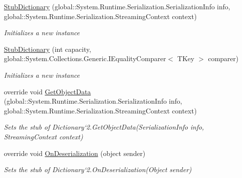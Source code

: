 \begin{DoxyCompactItemize}
\hyperlink{class_system_1_1_collections_1_1_generic_1_1_fakes_1_1_stub_dictionary_3_01_t_key_00_01_t_value_01_4_ae3ff78cf04461f0a35bd75524e225815}{Stub\-Dictionary} (global\-::\-System.\-Runtime.\-Serialization.\-Serialization\-Info info, global\-::\-System.\-Runtime.\-Serialization.\-Streaming\-Context context)
\begin{DoxyCompactList}\small\item\em Initializes a new instance\end{DoxyCompactList}\item 
\hyperlink{class_system_1_1_collections_1_1_generic_1_1_fakes_1_1_stub_dictionary_3_01_t_key_00_01_t_value_01_4_afbaf1846f7eff67ea06a9dc59f83c4a6}{Stub\-Dictionary} (int capacity, global\-::\-System.\-Collections.\-Generic.\-I\-Equality\-Comparer$<$ T\-Key $>$ comparer)
\begin{DoxyCompactList}\small\item\em Initializes a new instance\end{DoxyCompactList}\item 
override void \hyperlink{class_system_1_1_collections_1_1_generic_1_1_fakes_1_1_stub_dictionary_3_01_t_key_00_01_t_value_01_4_a757481eca6f9ac5419494f705756c2a8}{Get\-Object\-Data} (global\-::\-System.\-Runtime.\-Serialization.\-Serialization\-Info info, global\-::\-System.\-Runtime.\-Serialization.\-Streaming\-Context context)
\begin{DoxyCompactList}\small\item\em Sets the stub of Dictionary`2.Get\-Object\-Data(\-Serialization\-Info info, Streaming\-Context context)\end{DoxyCompactList}\item 
override void \hyperlink{class_system_1_1_collections_1_1_generic_1_1_fakes_1_1_stub_dictionary_3_01_t_key_00_01_t_value_01_4_a2b8802759d5a871e013d5c0d4442aa0b}{On\-Deserialization} (object sender)
\begin{DoxyCompactList}\small\item\em Sets the stub of Dictionary`2.On\-Deserialization(\-Object sender)\end{DoxyCompactList}\end{DoxyCompactItemize}
